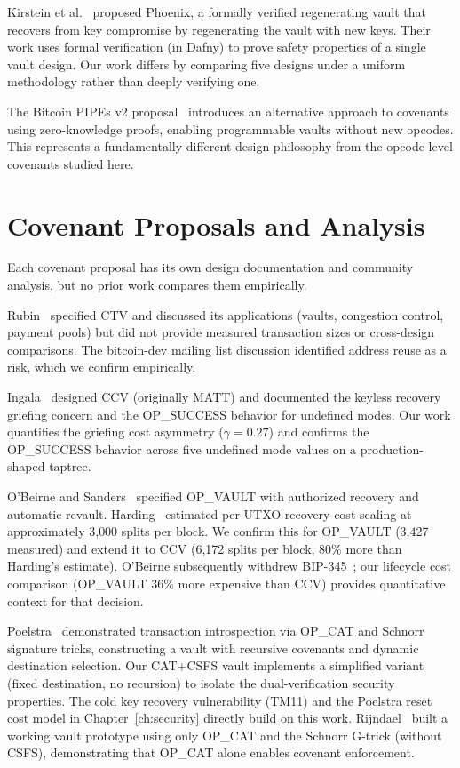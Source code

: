 Kirstein et al.~\cite{KLGZ21} proposed Phoenix, a formally verified regenerating
vault that recovers from key compromise by regenerating the vault with new keys.
Their work uses formal verification (in Dafny) to prove safety properties of a
single vault design. Our work differs by comparing five designs under a uniform
methodology rather than deeply verifying one.

The Bitcoin PIPEs v2 proposal~\cite{PIPES26} introduces an alternative approach to
covenants using zero-knowledge proofs, enabling programmable vaults without new
opcodes. This represents a fundamentally different design philosophy from the
opcode-level covenants studied here.

\section{Covenant Proposals and Analysis} \label{se:rw_covenants}

Each covenant proposal has its own design documentation and community analysis, but
no prior work compares them empirically.

Rubin~\cite{BIP119} specified CTV and discussed its applications (vaults, congestion
control, payment pools) but did not provide measured transaction sizes or cross-design
comparisons. The bitcoin-dev mailing list discussion identified address reuse as a
risk, which we confirm empirically.

Ingala~\cite{BIP443} designed CCV (originally MATT) and documented the keyless recovery
griefing concern and the OP\_SUCCESS behavior for undefined modes. Our work quantifies
the griefing cost asymmetry ($\gamma = 0.27$) and confirms the OP\_SUCCESS behavior
across five undefined mode values on a production-shaped taptree.

O'Beirne and Sanders~\cite{BIP345} specified OP\_VAULT with authorized recovery and
automatic revault. Harding~\cite{Har24} estimated per-UTXO recovery-cost scaling at
approximately 3{,}000 splits per block. We confirm this for OP\_VAULT (3{,}427
measured) and extend it to CCV (6{,}172 splits per block, 80\% more than Harding's
estimate). O'Beirne subsequently withdrew BIP-345~\cite{OB25}; our lifecycle cost
comparison (OP\_VAULT 36\% more expensive than CCV) provides quantitative context for
that decision.

Poelstra~\cite{Poe21} demonstrated transaction introspection via OP\_CAT and Schnorr
signature tricks, constructing a vault with recursive covenants and dynamic destination
selection. Our CAT+CSFS vault implements a simplified variant (fixed destination, no
recursion) to isolate the dual-verification security properties. The cold key recovery
vulnerability (TM11) and the Poelstra reset cost model in Chapter~\ref{ch:security}
directly build on this work. Rijndael~\cite{Rij24} built a working vault prototype
using only OP\_CAT and the Schnorr G-trick (without CSFS), demonstrating that OP\_CAT
alone enables covenant enforcement.


